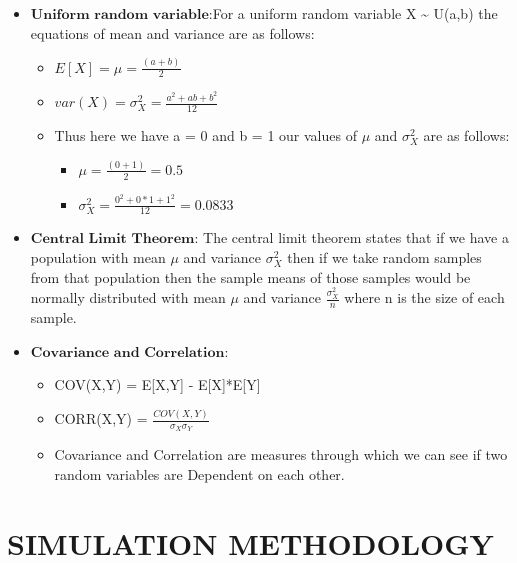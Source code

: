 \documentclass[11pt]{article}
\begin{document}
\begin{itemize}
\item
  \(\textbf{Uniform random variable}\):For a uniform random variable X
  \textasciitilde{} U(a,b) the equations of mean and variance are as
  follows:

  \begin{itemize}
  \item
    \(E[X] = \mu = \frac{(a+b)}{2}\)
  \item
    \(var(X) = \sigma_X^2 = \frac{a^2+ab+b^2}{12}\)
  \item
    Thus here we have a = 0 and b = 1 our values of \(\mu\) and
    \(\sigma_X^2\) are as follows:

    \begin{itemize}
    \item
      \(\mu = \frac{(0+1)}{2} = 0.5\)
    \item
      \(\sigma_X^2 = \frac{0^2+0*1+1^2}{12} = 0.0833\)
    \end{itemize}
  \end{itemize}
\item
  \(\textbf{Central Limit Theorem}\): The central limit theorem states
  that if we have a population with mean \(\mu\) and variance
  \(\sigma_X^2\) then if we take random samples from that population
  then the sample means of those samples would be normally distributed
  with mean \(\mu\) and variance \(\frac{\sigma_X^2}{n}\) where n is the
  size of each sample.
\item
  \(\textbf{Covariance and Correlation}\):

  \begin{itemize}
  \item
    COV(X,Y) = E{[}X,Y{]} - E{[}X{]}*E{[}Y{]}
  \item
    CORR(X,Y) = \(\frac{COV(X,Y)}{\sigma_{X}\sigma_{Y}}\)
  \item
    Covariance and Correlation are measures through which we can see if
    two random variables are Dependent on each other.
  \end{itemize}
\end{itemize}

    \section{SIMULATION METHODOLOGY}\label{simulation-methodology}
\end{document}
